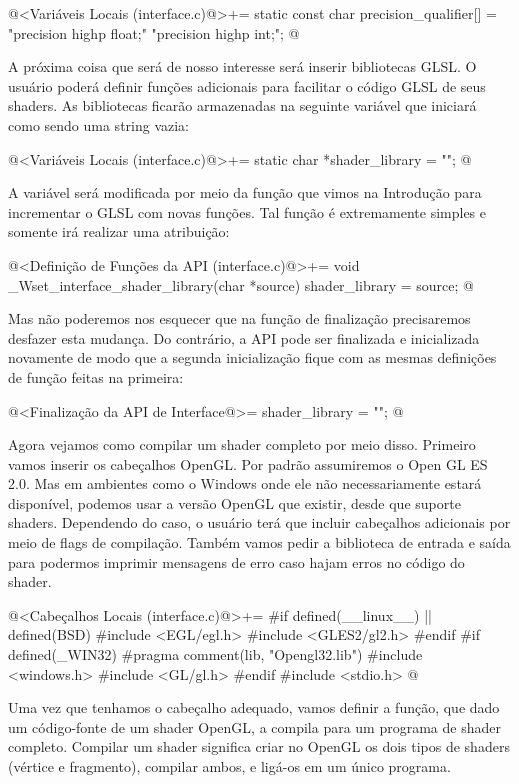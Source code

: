 \iniciocodigo
@<Variáveis Locais (interface.c)@>+=
static const char precision_qualifier[] = "precision highp float;\n"
                                          "precision highp int;\n";
@
\fimcodigo

A próxima coisa que será de nosso interesse será inserir bibliotecas
GLSL. O usuário poderá definir funções adicionais para facilitar o
código GLSL de seus shaders. As bibliotecas ficarão armazenadas na
seguinte variável que iniciará como sendo uma string vazia:

\iniciocodigo
@<Variáveis Locais (interface.c)@>+=
static char *shader_library = "";
@
\fimcodigo

A variável será modificada por meio da função que vimos na Introdução
para incrementar o GLSL com novas funções. Tal função é extremamente
simples e somente irá realizar uma atribuição:

\iniciocodigo
@<Definição de Funções da API (interface.c)@>+=
void _Wset_interface_shader_library(char *source){
  shader_library = source;
}
@
\fimcodigo

Mas não poderemos nos esquecer que na função de finalização
precisaremos desfazer esta mudança. Do contrário, a API pode ser
finalizada e inicializada novamente de modo que a segunda
inicialização fique com as mesmas definições de função feitas na
primeira:

\iniciocodigo
@<Finalização da API de Interface@>=
shader_library = "";
@
\fimcodigo

Agora vejamos como compilar um shader completo por meio
disso. Primeiro vamos inserir os cabeçalhos OpenGL. Por padrão
assumiremos o Open GL ES 2.0. Mas em ambientes como o Windows onde ele
não necessariamente estará disponível, podemos usar a versão OpenGL
que existir, desde que suporte shaders. Dependendo do caso, o usuário
terá que incluir cabeçalhos adicionais por meio de flags de
compilação. Também vamos pedir a biblioteca de entrada e saída para
podermos imprimir mensagens de erro caso hajam erros no código do
shader.

\iniciocodigo
@<Cabeçalhos Locais (interface.c)@>+=
#if defined(__linux__) || defined(BSD)
#include <EGL/egl.h>
#include <GLES2/gl2.h>
#endif
#if defined(_WIN32)
#pragma comment(lib, "Opengl32.lib")
#include <windows.h>
#include <GL/gl.h>
#endif
#include <stdio.h>
@
\fimcodigo

Uma vez que tenhamos o cabeçalho adequado, vamos definir a função, que
dado um código-fonte de um shader OpenGL, a compila para um programa
de shader completo. Compilar um shader significa criar no OpenGL os
dois tipos de shaders (vértice e fragmento), compilar ambos, e ligá-os
em um único programa.

